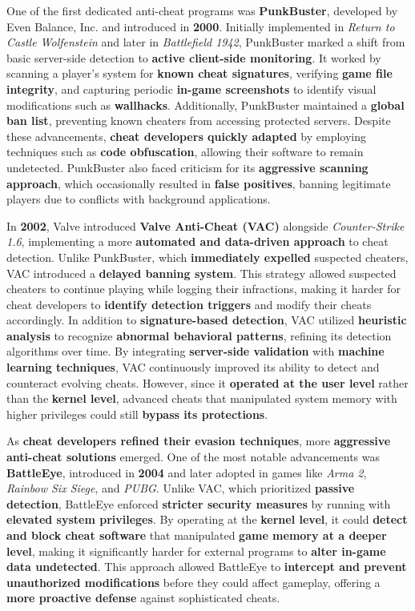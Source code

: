 One of the first dedicated anti-cheat programs was \textbf{PunkBuster}, developed by Even Balance, Inc. and introduced in \textbf{2000}. Initially implemented in \textit{Return to Castle Wolfenstein} and later in \textit{Battlefield 1942}, PunkBuster marked a shift from basic server-side detection to \textbf{active client-side monitoring}. It worked by scanning a player’s system for \textbf{known cheat signatures}, verifying \textbf{game file integrity}, and capturing periodic \textbf{in-game screenshots} to identify visual modifications such as \textbf{wallhacks}. Additionally, PunkBuster maintained a \textbf{global ban list}, preventing known cheaters from accessing protected servers. Despite these advancements, \textbf{cheat developers quickly adapted} by employing techniques such as \textbf{code obfuscation}, allowing their software to remain undetected. PunkBuster also faced criticism for its \textbf{aggressive scanning approach}, which occasionally resulted in \textbf{false positives}, banning legitimate players due to conflicts with background applications.

In \textbf{2002}, Valve introduced \textbf{Valve Anti-Cheat (VAC)} alongside \textit{Counter-Strike 1.6}, implementing a more \textbf{automated and data-driven approach} to cheat detection. Unlike PunkBuster, which \textbf{immediately expelled} suspected cheaters, VAC introduced a \textbf{delayed banning system}. This strategy allowed suspected cheaters to continue playing while logging their infractions, making it harder for cheat developers to \textbf{identify detection triggers} and modify their cheats accordingly. In addition to \textbf{signature-based detection}, VAC utilized \textbf{heuristic analysis} to recognize \textbf{abnormal behavioral patterns}, refining its detection algorithms over time. By integrating \textbf{server-side validation} with \textbf{machine learning techniques}, VAC continuously improved its ability to detect and counteract evolving cheats. However, since it \textbf{operated at the user level} rather than the \textbf{kernel level}, advanced cheats that manipulated system memory with higher privileges could still \textbf{bypass its protections}.

As \textbf{cheat developers refined their evasion techniques}, more \textbf{aggressive anti-cheat solutions} emerged. One of the most notable advancements was \textbf{BattleEye}, introduced in \textbf{2004} and later adopted in games like \textit{Arma 2}, \textit{Rainbow Six Siege}, and \textit{PUBG}. Unlike VAC, which prioritized \textbf{passive detection}, BattleEye enforced \textbf{stricter security measures} by running with \textbf{elevated system privileges}. By operating at the \textbf{kernel level}, it could \textbf{detect and block cheat software} that manipulated \textbf{game memory at a deeper level}, making it significantly harder for external programs to \textbf{alter in-game data undetected}. This approach allowed BattleEye to \textbf{intercept and prevent unauthorized modifications} before they could affect gameplay, offering a \textbf{more proactive defense} against sophisticated cheats.


